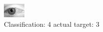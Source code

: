 \begin{figure}[h!]
\begin{center}
\includegraphics[width=0.60\columnwidth]{figures/ID2848_class_4_target_3.png}
\end{center}
\caption{ Classification: 4 actual target: 3}
\label{fig:ID2848_class_4_target_3}
\end{figure}
